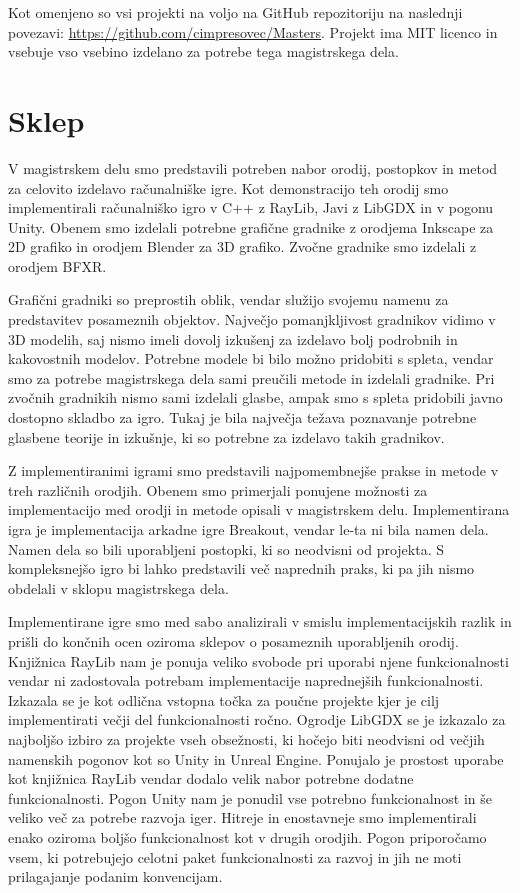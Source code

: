 \documentclass[12pt,a4paper,twoside]{book}
\begin{document}
Kot omenjeno so vsi projekti na voljo na GitHub repozitoriju na naslednji povezavi: \url{https://github.com/cimpresovec/Masters}. Projekt ima MIT licenco in vsebuje vso vsebino izdelano za potrebe tega magistrskega dela.

\chapter{Sklep}\thispagestyle{fancy}
V magistrskem delu smo predstavili potreben nabor orodij, postopkov in metod za celovito izdelavo računalniške igre. Kot demonstracijo teh orodij smo implementirali računalniško igro v C++ z RayLib, Javi z LibGDX in v pogonu Unity. Obenem smo izdelali potrebne grafične gradnike z orodjema Inkscape za 2D grafiko in orodjem Blender za 3D grafiko. Zvočne gradnike smo izdelali z orodjem BFXR.

Grafični gradniki so preprostih oblik, vendar služijo svojemu namenu za predstavitev posameznih objektov. Največjo pomanjkljivost gradnikov vidimo v 3D modelih, saj nismo imeli dovolj izkušenj za izdelavo bolj podrobnih in kakovostnih modelov. Potrebne modele bi bilo možno pridobiti s spleta, vendar smo za potrebe magistrskega dela sami preučili metode in izdelali gradnike. Pri zvočnih gradnikih nismo sami izdelali glasbe, ampak smo s spleta pridobili javno dostopno skladbo za igro. Tukaj je bila največja težava poznavanje potrebne glasbene teorije in izkušnje, ki so potrebne za izdelavo takih gradnikov.

Z implementiranimi igrami smo predstavili najpomembnejše prakse in metode v treh različnih orodjih. Obenem smo primerjali ponujene možnosti za implementacijo med orodji in metode opisali v magistrskem delu. Implementirana igra je implementacija arkadne igre Breakout, vendar le-ta ni bila namen dela. Namen dela so bili uporabljeni postopki, ki so neodvisni od projekta. S kompleksnejšo igro bi lahko predstavili več naprednih praks, ki pa jih nismo obdelali v sklopu magistrskega dela.

Implementirane igre smo med sabo analizirali v smislu implementacijskih razlik in prišli do končnih ocen oziroma sklepov o posameznih uporabljenih orodij. Knjižnica RayLib nam je ponuja veliko svobode pri uporabi njene funkcionalnosti vendar ni zadostovala potrebam implementacije naprednejših funkcionalnosti. Izkazala se je kot odlična vstopna točka za poučne projekte kjer je cilj implementirati večji del funkcionalnosti ročno. Ogrodje LibGDX se je izkazalo za najboljšo izbiro za projekte vseh obsežnosti, ki hočejo biti neodvisni od večjih namenskih pogonov kot so Unity in Unreal Engine. Ponujalo je prostost uporabe kot knjižnica RayLib vendar dodalo velik nabor potrebne dodatne funkcionalnosti. Pogon Unity nam je ponudil vse potrebno funkcionalnost in še veliko več za potrebe razvoja iger. Hitreje in enostavneje smo implementirali enako oziroma boljšo funkcionalnost kot v drugih orodjih. Pogon priporočamo vsem, ki potrebujejo celotni paket funkcionalnosti za razvoj in jih ne moti prilagajanje podanim konvencijam.
\end{document}
